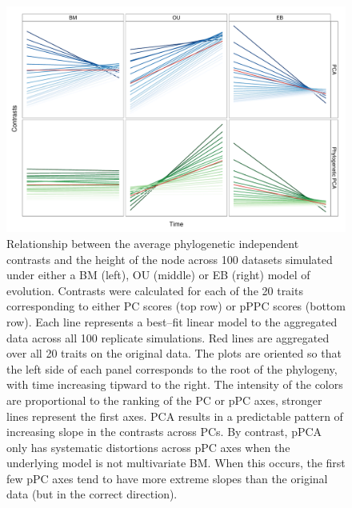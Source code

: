 \documentclass[a4paper,11pt]{article}
\begin{document}
\begin{figure}[p]
\centering
\includegraphics[scale=0.65]{./fig/nh-2panel.pdf}
\caption{Relationship between the average phylogenetic independent contrasts and the height of the node across 100 datasets simulated under either a BM (left), OU (middle) or EB (right) model of evolution. Contrasts were calculated for each of the 20 traits corresponding to either PC scores (top row) or pPPC scores (bottom row). Each line represents a best--fit linear model to the aggregated data across all 100 replicate simulations. Red lines are aggregated over all 20 traits on the original data. The plots are oriented so that the left side of each panel corresponds to the root of the phylogeny, with time increasing tipward to the right. The intensity of the colors are proportional to the ranking of the PC or pPC axes, stronger lines represent the first axes. PCA results in a predictable pattern of increasing slope in the contrasts across PCs. By contrast, pPCA only has systematic distortions across pPC axes when the underlying model is not multivariate BM. When this occurs, the first few pPC axes tend to have more extreme slopes than the original data (but in the correct direction).}
\label{nhplot}
\end{figure}
\end{document}
